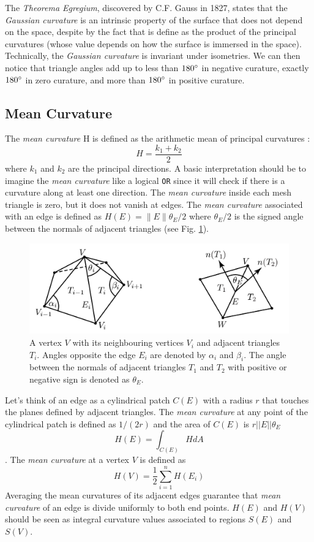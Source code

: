 The \textit{Theorema Egregium}, discovered by C.F. Gauss in 1827, states that the \textit{Gaussian curvature} is an intrinsic property of the surface that does not depend on the space, despite by the fact that is define as the product of the principal curvatures (whose value depends on how the surface is immersed in the space). Technically, the \textit{Gaussian curvature} is invariant under isometries.
We can then notice that triangle angles add up to less than $180 \degree$ in negative curature, exactly $180 \degree$ in zero curature, and more than $180 \degree$ in positive curature.
\cite{geometryprocessing}

\subsection{Mean Curvature}
The \textit{mean curvature} H is defined as the arithmetic mean of principal curvatures : $$H = \frac{k_1 + k_2}{2}$$ where $k_1$ and $k_2$ are the principal directions. A basic interpretation should be to imagine the \textit{mean curvature} like a logical \texttt{OR} since it will check if there is a curvature along at least one direction.\cite{WEBSITE:gaussiancurvaturedirty}
The \textit{mean curvature} inside each mesh triangle is zero, but it does not vanish at edges. The \textit{mean curvature} associated with an edge is defined as $H(E) = \parallel E \parallel {\theta}_E/2$ where ${\theta}_E/2$ is the signed
angle between the normals of adjacent triangles (see Fig. \ref{fig:mean-curvature}).

\begin{figure}[h]
  \centering
\includegraphics[scale=0.4]{images/mean_curvature_paper.png}
\caption{A vertex $V$ with its neighbouring vertices $V_i$ and adjacent triangles $T_i$. Angles opposite the edge $E_i$ are denoted by $\alpha_i$ and $\beta_i$. The
angle between the normals of adjacent triangles $T_1$ and $T_2$ with positive or negative sign is denoted as ${\theta}_E$.\cite{geometryprocessing}}\label{fig:mean-curvature}
\end{figure}
Let's think of an edge as a cylindrical patch $C(E)$ with a radius $r$ that touches the planes defined by adjacent triangles. The \textit{mean curvature} at any point of the cylindrical patch is defined as $1/(2r)$ and the area of $C(E)$ is $r||E||\theta_E$
$$H(E) = \int_{C(E)} HdA$$. The \textit{mean curvature} at a vertex $V$ is defined as $$H(V) = \frac{1}{2} \sum_{i=1}^n H(E_i)$$ Averaging the mean curvatures of its adjacent edges guarantee that \textit{mean curvature} of an edge is divide uniformly to both end points. $H(E)$ and $H(V)$ should be seen as integral curvature values associated to regions $S(E)$ and $S(V)$.
\cite{geometryprocessing}
